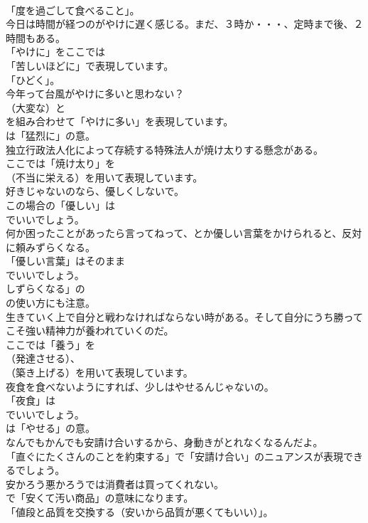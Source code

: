 \documentclass[8pt]{extreport}
\begin{document}
\begin{CJK}{UTF8}{min}
\\	「度を過ごして食べること」。	
\\	今日は時間が経つのがやけに遅く感じる。まだ、３時か・・・、定時まで後、２時間もある。 
\\	「やけに」をここでは
\\	「苦しいほどに」で表現しています。
\\	「ひどく」。	
\\	今年って台風がやけに多いと思わない？ 
\\	（大変な）と 
\\	を組み合わせて「やけに多い」を表現しています。
\\	は「猛烈に」の意。	
\\	独立行政法人化によって存続する特殊法人が焼け太りする懸念がある。 
\\	ここでは「焼け太り」を 
\\	（不当に栄える）を用いて表現しています。	
\\	好きじゃないのなら、優しくしないで。 
\\	この場合の「優しい」は
\\	でいいでしょう。	
\\	何か困ったことがあったら言ってねって、とか優しい言葉をかけられると、反対に頼みずらくなる。 
\\	「優しい言葉」はそのまま
\\	でいいでしょう。
\\	しずらくなる」の
\\	の使い方にも注意。	
\\	生きていく上で自分と戦わなければならない時がある。そして自分にうち勝ってこそ強い精神力が養われていくのだ。 
\\	ここでは「養う」を
\\	（発達させる）、
\\	（築き上げる）を用いて表現しています。	
\\	夜食を食べないようにすれば、少しはやせるんじゃないの。 
\\	「夜食」は 
\\	でいいでしょう。
\\	は「やせる」の意。	
\\	なんでもかんでも安請け合いするから、身動きがとれなくなるんだよ。 
\\	「直ぐにたくさんのことを約束する」で「安請け合い」のニュアンスが表現できるでしょう。	
\\	安かろう悪かろうでは消費者は買ってくれない。 
\\	で「安くて汚い商品」の意味になります。
\\	「値段と品質を交換する（安いから品質が悪くてもいい）」。	

\end{CJK}
\end{document}
